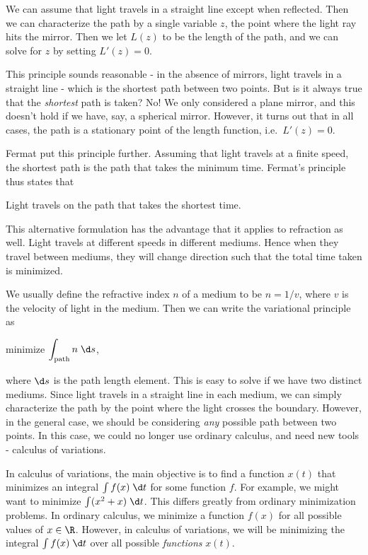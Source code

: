 \documentclass[a4paper]{article}
\begin{document}
We can assume that light travels in a straight line except when reflected. Then we can characterize the path by a single variable $z$, the point where the light ray hits the mirror. Then we let $L(z)$ to be the length of the path, and we can solve for $z$ by setting $L'(z) = 0$.

This principle sounds reasonable - in the absence of mirrors, light travels in a straight line - which is the shortest path between two points. But is it always true that the \emph{shortest} path is taken? No! We only considered a plane mirror, and this doesn't hold if we have, say, a spherical mirror. However, it turns out that in all cases, the path is a stationary point of the length function, i.e.\ $L'(z) = 0$.

Fermat put this principle further. Assuming that light travels at a finite speed, the shortest path is the path that takes the minimum time. Fermat's principle thus states that
\begin{center}
  Light travels on the path that takes the shortest time.
\end{center}
This alternative formulation has the advantage that it applies to refraction as well. Light travels at different speeds in different mediums. Hence when they travel between mediums, they will change direction such that the total time taken is minimized.

We usually define the refractive index $n$ of a medium to be $n = 1/v$, where $v$ is the velocity of light in the medium. Then we can write the variational principle as
\begin{center}
  minimize $\displaystyle \int_{\text{path}} n\;\d s$,
\end{center}
where $\d s$ is the path length element. This is easy to solve if we have two distinct mediums. Since light travels in a straight line in each medium, we can simply characterize the path by the point where the light crosses the boundary. However, in the general case, we should be considering \emph{any} possible path between two points. In this case, we could no longer use ordinary calculus, and need new tools - calculus of variations.

In calculus of variations, the main objective is to find a function $x(t)$ that minimizes an integral $\int f(x)\;\d t$ for some function $f$. For example, we might want to minimize $\int (x^2 + x)\;\d t$. This differs greatly from ordinary minimization problems. In ordinary calculus, we minimize a function $f(x)$ for all possible values of $x\in \R$. However, in calculus of variations, we will be minimizing the integral $\int f(x)\;\d t$ over all possible \emph{functions} $x(t)$.
\end{document}
